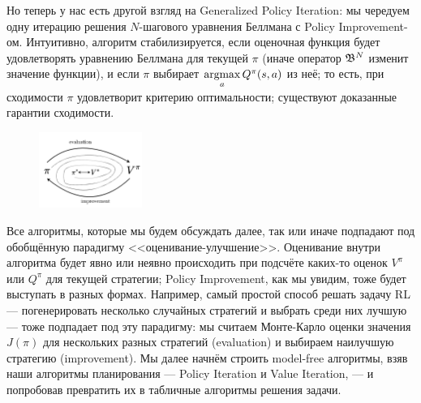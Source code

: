 Но теперь у нас есть другой взгляд на Generalized Policy Iteration: мы чередуем одну итерацию решения $N$-шагового уравнения Беллмана с Policy Improvement-ом. Интуитивно, алгоритм стабилизируется, если оценочная функция будет удовлетворять уравнению Беллмана для текущей $\pi$ (иначе оператор $\mathfrak{B}^N$ изменит значение функции), и если $\pi$ выбирает $\mathop{\mathrm{argmax}}\limits_{a} Q^{\pi}(s, a)$ из неё; то есть, при сходимости $\pi$ удовлетворит критерию оптимальности; существуют доказанные гарантии сходимости.

\begin{figure}
\vspace{-0.7cm}
\centering
\includegraphics[width=0.3\textwidth]{Images/GPI.png}
\vspace{-0.5cm}
\end{figure}

Все алгоритмы, которые мы будем обсуждать далее, так или иначе подпадают под обобщённую парадигму <<оценивание-улучшение>>. Оценивание внутри алгоритма будет явно или неявно происходить при подсчёте каких-то оценок $V^{\pi}$ или $Q^{\pi}$ для текущей стратегии; Policy Improvement, как мы увидим, тоже будет выступать в разных формах. Например, самый простой способ решать задачу RL --- погенерировать несколько случайных стратегий и выбрать среди них лучшую --- тоже подпадает под эту парадигму: мы считаем Монте-Карло оценки значения $J(\pi)$ для нескольких разных стратегий (evaluation) и выбираем наилучшую стратегию (improvement). Мы далее начнём строить model-free алгоритмы, взяв наши алгоритмы планирования --- Policy Iteration и Value Iteration, --- и попробовав превратить их в табличные алгоритмы решения задачи.


